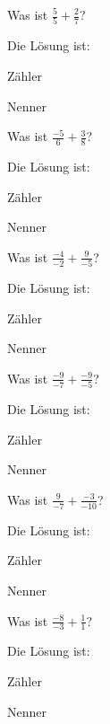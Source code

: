 \documentclass{ximera}
\begin{document}
\begin{shuffle}
\begin{question}
Was ist $\frac{5}{5} + \frac{2}{7}$?
\begin{solution}
Die Lösung ist:

Zähler 

Nenner 
\end{solution}
\end{question}


\begin{question}
Was ist $\frac{-5}{6} + \frac{3}{8}$?
\begin{solution}
Die Lösung ist:

Zähler 

Nenner 
\end{solution}
\end{question}


\begin{question}
Was ist $\frac{-4}{-2} + \frac{9}{-5}$?
\begin{solution}
Die Lösung ist:

Zähler 

Nenner 
\end{solution}
\end{question}


\begin{question}
Was ist $\frac{-9}{-7} + \frac{-9}{-5}$?
\begin{solution}
Die Lösung ist:

Zähler 

Nenner 
\end{solution}
\end{question}


\begin{question}
Was ist $\frac{9}{-7} + \frac{-3}{-10}$?
\begin{solution}
Die Lösung ist:

Zähler 

Nenner 
\end{solution}
\end{question}


\begin{question}
Was ist $\frac{-8}{-3} + \frac{1}{1}$?
\begin{solution}
Die Lösung ist:

Zähler 

Nenner 
\end{solution}
\end{question}



\end{shuffle}
\end{document}
